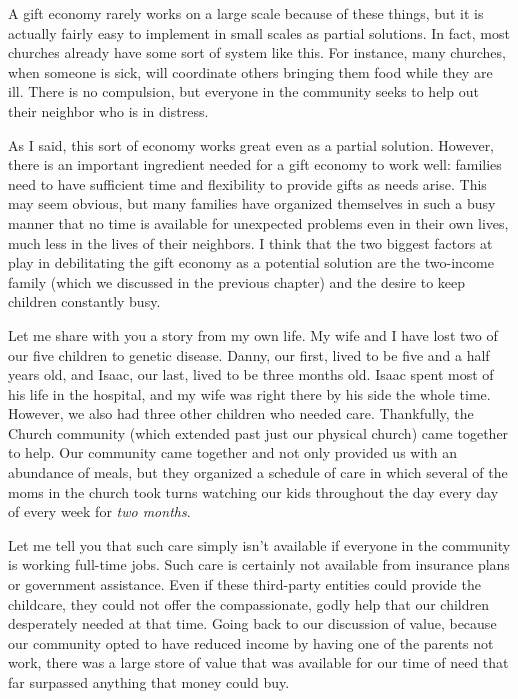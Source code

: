 A gift economy rarely works on a large scale because of these
things, but it is actually fairly easy to implement in small scales as
partial solutions. In fact, most churches already have some sort of
system like this. For instance, many churches, when someone is sick,
will coordinate others bringing them food while they are ill. There is
no compulsion, but everyone in the community seeks to help out their
neighbor who is in distress. 

As I said, this sort of economy works great even as a partial solution.
However, there is an important ingredient needed for a gift economy to
work well: families need to have sufficient time and flexibility to
provide gifts as needs arise. This may seem obvious, but many families
have organized themselves in such a busy manner that no time is
available for unexpected problems even in their own lives, much less in
the lives of their neighbors.  I think that the two biggest factors at play in
debilitating the gift economy as a potential solution are the two-income family (which
we discussed in the previous chapter) and
the desire to keep children constantly busy.

Let me share with you a story from my own life. My wife and I have lost
two of our five children to genetic disease. Danny, our first, lived to
be five and a half years old, and Isaac, our last, lived to be three
months old. Isaac spent most of his life in the hospital, and my wife
was right there by his side the whole time. However, we also had three
other children who needed care. Thankfully, the Church community (which
extended past just our physical church) came together to help. Our
community came together and not only provided us with an abundance of
meals, but they organized a schedule of care in which several of the
moms in the church took turns watching our kids throughout the day
every day of every week for \textit{two months}. 

Let me tell you that such care simply isn’t available if everyone in the
community is working full-time jobs. Such care is certainly not
available from insurance plans or government assistance. Even if these
third-party entities could provide the childcare, they could not offer
the compassionate,
godly help that our children desperately needed at that time. Going
back to our discussion of value, because our community opted to have
reduced income by having one of the parents not work, there was a large
store of value that was available for our time of need that far surpassed anything that
money could buy.

